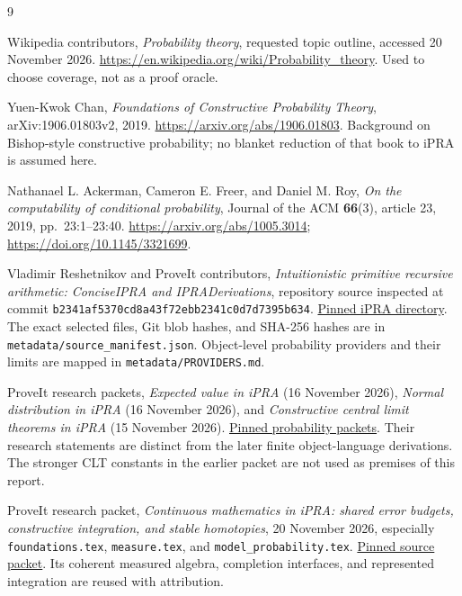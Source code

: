 \begin{thebibliography}{9}

Wikipedia contributors, \emph{Probability theory}, requested topic outline,
accessed 20 November 2026.
\url{https://en.wikipedia.org/wiki/Probability_theory}.
Used to choose coverage, not as a proof oracle.

Yuen-Kwok Chan, \emph{Foundations of Constructive Probability Theory},
arXiv:1906.01803v2, 2019.
\url{https://arxiv.org/abs/1906.01803}.
Background on Bishop-style constructive probability; no blanket reduction
of that book to iPRA is assumed here.

Nathanael L. Ackerman, Cameron E. Freer, and Daniel M. Roy,
\emph{On the computability of conditional probability},
Journal of the ACM \textbf{66}(3), article 23, 2019, pp.\ 23:1--23:40.
\url{https://arxiv.org/abs/1005.3014};
\url{https://doi.org/10.1145/3321699}.

Vladimir Reshetnikov and ProveIt contributors,
\emph{Intuitionistic primitive recursive arithmetic: ConciseIPRA and
IPRADerivations}, repository source inspected at commit
\texttt{b2341af5370cd8a43f72ebb2341c0d7d7395b634}.
\href{https://github.com/VladimirReshetnikov/ProveIt/tree/b2341af5370cd8a43f72ebb2341c0d7d7395b634/Logic/PrimitiveRecursiveArithmetic}{Pinned iPRA directory}.
The exact selected files, Git blob hashes, and SHA-256 hashes are in
\texttt{metadata/source\_manifest.json}. Object-level probability providers
and their limits are mapped in \texttt{metadata/PROVIDERS.md}.

ProveIt research packets,
\emph{Expected value in iPRA} (16 November 2026),
\emph{Normal distribution in iPRA} (16 November 2026), and
\emph{Constructive central limit theorems in iPRA} (15 November 2026).
\href{https://github.com/VladimirReshetnikov/ProveIt/tree/b2341af5370cd8a43f72ebb2341c0d7d7395b634/Logic/PrimitiveRecursiveArithmetic/docs/proofs/probability}{Pinned probability packets}.
Their research statements are distinct from the later finite object-language
derivations. The stronger CLT constants in the earlier packet are not used
as premises of this report.

ProveIt research packet,
\emph{Continuous mathematics in iPRA: shared error budgets, constructive
integration, and stable homotopies}, 20 November 2026, especially
\texttt{foundations.tex}, \texttt{measure.tex}, and
\texttt{model\_probability.tex}.
\href{https://github.com/VladimirReshetnikov/ProveIt/tree/83421593771f877bc1ae98f4229eb35507bff05b/Logic/PrimitiveRecursiveArithmetic/docs/proofs/foundations/ipra_observable_analysis_2026-11-20}{Pinned source packet}.
Its coherent measured algebra, completion interfaces, and represented
integration are reused with attribution.


\end{thebibliography}
